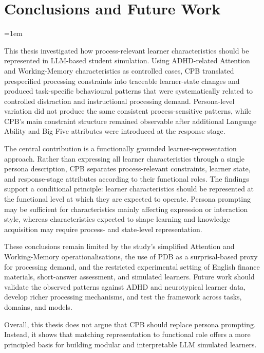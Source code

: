 \chapter{Conclusions and Future Work} \label{Chap5}

\begingroup
\emergencystretch=1em

This thesis investigated how process-relevant learner characteristics should be represented in LLM-based student simulation. Using ADHD-related Attention and Working-Memory characteristics as controlled cases, CPB translated prespecified processing constraints into traceable learner-state changes and produced task-specific behavioural patterns that were systematically related to controlled distraction and instructional processing demand. Persona-level variation did not produce the same consistent process-sensitive patterns, while CPB's main constraint structure remained observable after additional Language Ability and Big Five attributes were introduced at the response stage.

The central contribution is a functionally grounded learner-representation approach. Rather than expressing all learner characteristics through a single persona description, CPB separates process-relevant constraints, learner state, and response-stage attributes according to their functional roles. The findings support a conditional principle: learner characteristics should be represented at the functional level at which they are expected to operate. Persona prompting may be sufficient for characteristics mainly affecting expression or interaction style, whereas characteristics expected to shape learning and knowledge acquisition may require process- and state-level representation.

These conclusions remain limited by the study's simplified Attention and Working-Memory operationalisations, the use of PDB as a surprisal-based proxy for processing demand, and the restricted experimental setting of English finance materials, short-answer assessment, and simulated learners. Future work should validate the observed patterns against ADHD and neurotypical learner data, develop richer processing mechanisms, and test the framework across tasks, domains, and models.

Overall, this thesis does not argue that CPB should replace persona prompting. Instead, it shows that matching representation to functional role offers a more principled basis for building modular and interpretable LLM simulated learners.

\endgroup
